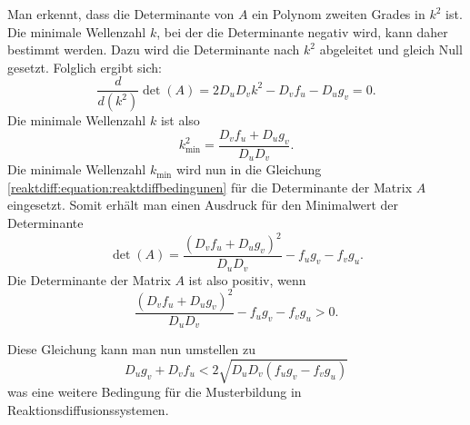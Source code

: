 Man erkennt, dass die Determinante von \(A\) ein Polynom zweiten Grades in \(k^2\) ist.  
Die minimale Wellenzahl \(k\), bei der die Determinante negativ wird, kann daher bestimmt werden.  
Dazu wird die Determinante nach \(k^2\) abgeleitet und gleich Null gesetzt.  
Folglich ergibt sich:
\begin{equation*}
    \frac{d}{d \left(k^2\right)} \det(A) = 2 D_u D_v k^2 - D_v f_u - D_u g_v = 0.
\end{equation*}
Die minimale Wellenzahl \(k\) ist also
\begin{equation*}
    k^2_{\text{min}} = \frac{D_v f_u + D_u g_v}{D_u D_v}.
\end{equation*}
Die minimale Wellenzahl \(k_{\text{min}}\) wird nun in die Gleichung \eqref{reaktdiff:equation:reaktdiffbedingunen} für die Determinante der Matrix \(A\) eingesetzt.
Somit erhält man einen Ausdruck für den Minimalwert der Determinante
\begin{equation*}
    \det(A) = \frac{(D_v f_u + D_u g_v)^2}{D_u D_v} - f_u g_v - f_v g_u.
\end{equation*}
Die Determinante der Matrix \(A\) ist also positiv, wenn
\begin{equation*}
    \frac{(D_v f_u + D_u g_v)^2}{D_u D_v} - f_u g_v - f_v g_u > 0.
\end{equation*}

Diese Gleichung kann man nun umstellen zu
\begin{equation}
    D_u g_v+D_v f_u < 2\sqrt{D_u D_v(f_u g_v - f_v g_u)}
    \label{reaktdiff:equation:reaktdiffbedingung3}
\end{equation}
was eine weitere Bedingung für die Musterbildung in Reaktionsdiffusionssystemen.

